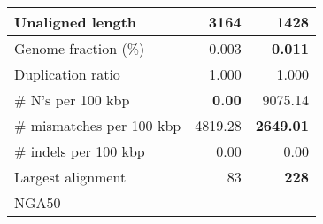 \documentclass[12pt,a4paper]{article}
\begin{document}
\begin{table}[ht]
\begin{center}
\begin{tabular}{|l*{2}{|r}|}
Unaligned length & 3164 & {\bf 1428} \\ \hline
Genome fraction (\%) & 0.003 & {\bf 0.011} \\ \hline
Duplication ratio & 1.000 & 1.000 \\ \hline
\# N's per 100 kbp & {\bf 0.00} & 9075.14 \\ \hline
\# mismatches per 100 kbp & 4819.28 & {\bf 2649.01} \\ \hline
\# indels per 100 kbp & 0.00 & 0.00 \\ \hline
Largest alignment & 83 & {\bf 228} \\ \hline
NGA50 & - & - \\ \hline
\end{tabular}
\end{center}
\end{table}
\end{document}
